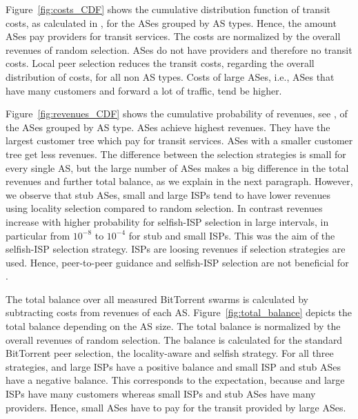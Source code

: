 Figure~\ref{fig:costs_CDF} shows the cumulative distribution function of transit costs, as calculated in , for the ASes grouped by AS types. Hence, the amount ASes pay providers for transit services. The costs are normalized by the overall revenues of random selection. \tier ASes do not have providers and therefore no transit costs. Local peer selection reduces the transit costs, regarding the overall distribution of costs, for all non \tier AS types. Costs of large ASes, i.e., ASes that have many customers and forward a lot of traffic, tend be higher.



Figure~\ref{fig:revenues_CDF} shows the cumulative probability of revenues, see , of the ASes grouped by AS type. \Tier ASes achieve highest revenues. They have the largest customer tree which pay for transit services. ASes with a smaller customer tree get less revenues. The difference between the selection strategies is small for every single AS, but the large number of ASes makes a big difference in the total revenues and further total balance, as we explain in the next paragraph. However, we observe that stub ASes, small and large ISPs tend to have lower revenues using locality selection compared to random selection. In contrast revenues increase with higher probability for selfish-ISP selection in large intervals, in particular from $10^{-8}$ to $10^{-4}$ for stub and small ISPs. This was the aim of the selfish-ISP selection strategy. \Tier ISPs are loosing revenues if selection strategies are used. Hence, peer-to-peer guidance and selfish-ISP selection are not beneficial for \tier.

The total balance over all measured BitTorrent swarms is calculated by subtracting costs from revenues of each AS. Figure~\ref{fig:total_balance} depicts the total balance depending on the AS size. The total balance is normalized by the overall revenues of random selection. The balance is calculated for the standard BitTorrent peer selection, the locality-aware and selfish strategy.
For all three strategies, \tier and large ISPs have a positive balance and small ISP and stub ASes have a negative balance. This corresponds to the expectation, because \tier and large ISPs have many customers whereas small ISPs and stub ASes have many providers. Hence, small ASes have to pay for the transit provided by large ASes.

